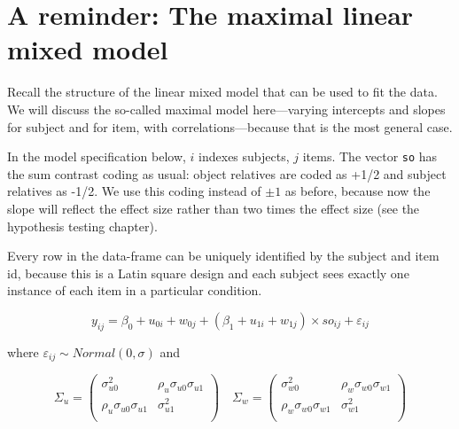 \documentclass[
  12pt,
]{krantz}
\theoremstyle{definition}
\theoremstyle{definition}
\theoremstyle{definition}
\theoremstyle{definition}
\theoremstyle{remark}
\begin{document}
\hypertarget{a-reminder-the-maximal-linear-mixed-model}{%
\section{A reminder: The maximal linear mixed model}\label{a-reminder-the-maximal-linear-mixed-model}}

Recall the structure of the linear mixed model that can be used to fit the \citet{grodner} data. We will discuss the so-called maximal model here---varying intercepts and slopes for subject and for item, with correlations---because that is the most general case.

In the model specification below, \(i\) indexes subjects, \(j\) items. The vector \texttt{so} has the sum contrast coding as usual: object relatives are coded as +1/2 and subject relatives as -1/2. We use this coding instead of \(\pm 1\) as before, because now the slope will reflect the effect size rather than two times the effect size (see the hypothesis testing chapter).

Every row in the data-frame can be uniquely identified by the subject and item id, because this is a Latin square design and each subject sees exactly one instance of each item in a particular condition.

\begin{equation}
y_{ij} = \beta_0 + u_{0i} + w_{0j} + (\beta_1 + u_{1i} + w_{1j}) \times so_{ij} + \varepsilon_{ij}
\end{equation}

where \(\varepsilon_{ij} \sim Normal(0,\sigma)\) and

\begin{equation}\label{eq:covmatsimulations}
\Sigma_u
=
\begin{pmatrix}
\sigma _{u0}^2  & \rho _{u}\sigma _{u0}\sigma _{u1}\\
\rho _{u}\sigma _{u0}\sigma _{u1}    & \sigma _{u1}^2\\
\end{pmatrix}
\quad 
\Sigma _w
=
\begin{pmatrix}
\sigma _{w0}^2  & \rho _{w}\sigma _{w0}\sigma _{w1}\\
\rho _{w}\sigma _{w0}\sigma _{w1}    & \sigma _{w1}^2\\
\end{pmatrix}
\end{equation}
\end{document}
